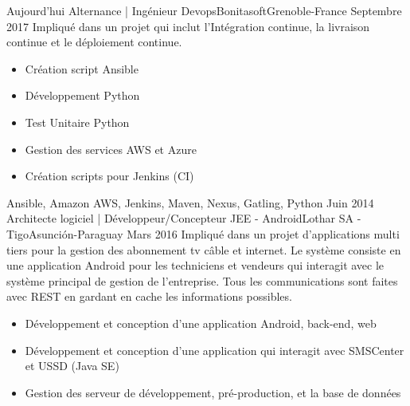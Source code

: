 %
%
%
\begin{experiences}
  \projectexperiences
    {Aujourd'hui}   {Alternance | Ingénieur Devops}{Bonitasoft}{Grenoble-France}
    {Septembre 2017}
                    {Impliqué dans un projet qui inclut l'Intégration continue, la livraison continue et le déploiement continue.}
                    {
                      \begin{itemize}
                        \item Création script Ansible
                        \item Développement Python
                        \item Test Unitaire Python
                        \item Gestion des services AWS et Azure
                        \item Création scripts pour Jenkins (CI)
                      \end{itemize}
                    }
                    {Ansible, Amazon AWS, Jenkins, Maven, Nexus, Gatling, Python}
  \emptySeparator
  \projectexperiences
    {Juin 2014}  {Architecte logiciel | Développeur/Concepteur JEE - Android}{Lothar SA - Tigo}{Asunción-Paraguay}
    {Mars 2016}
                 {Impliqué dans un projet d'applications multi tiers pour la gestion des abonnement tv câble et internet.
                 Le système consiste en une application Android pour les techniciens et vendeurs qui interagit avec le système
                 principal de gestion de l'entreprise. Tous les communications sont faites avec REST en gardant en cache les
                 informations possibles.
                }
                 {
                      \begin{itemize}
                        \item Développement et conception d'une application Android, back-end, web
                        \item Développement et conception d’une application qui interagit avec SMSCenter et USSD (Java SE)
                        \item Gestion des serveur de développement, pré-production, et la base de données

\end{itemize}}
\end{experiences}
